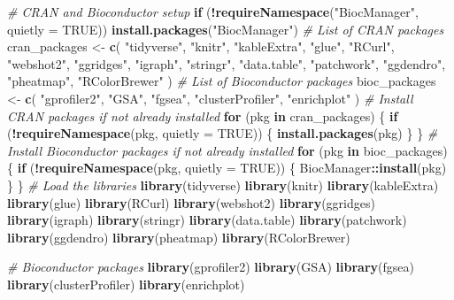 \documentclass[
]{book}
\newenvironment{Shaded}{\begin{snugshade}}{\end{snugshade}}
\newcommand{\AttributeTok}[1]{\textcolor[rgb]{0.13,0.29,0.53}{#1}}
\newcommand{\CommentTok}[1]{\textcolor[rgb]{0.56,0.35,0.01}{\textit{#1}}}
\newcommand{\ConstantTok}[1]{\textcolor[rgb]{0.56,0.35,0.01}{#1}}
\newcommand{\ControlFlowTok}[1]{\textcolor[rgb]{0.13,0.29,0.53}{\textbf{#1}}}
\newcommand{\FunctionTok}[1]{\textcolor[rgb]{0.13,0.29,0.53}{\textbf{#1}}}
\newcommand{\NormalTok}[1]{#1}
\newcommand{\OtherTok}[1]{\textcolor[rgb]{0.56,0.35,0.01}{#1}}
\newcommand{\SpecialCharTok}[1]{\textcolor[rgb]{0.81,0.36,0.00}{\textbf{#1}}}
\newcommand{\StringTok}[1]{\textcolor[rgb]{0.31,0.60,0.02}{#1}}
\begin{document}
\begin{Shaded}
\begin{Highlighting}[]
\CommentTok{\# CRAN and Bioconductor setup}
\ControlFlowTok{if}\NormalTok{ (}\SpecialCharTok{!}\FunctionTok{requireNamespace}\NormalTok{(}\StringTok{"BiocManager"}\NormalTok{, }\AttributeTok{quietly =} \ConstantTok{TRUE}\NormalTok{))}
  \FunctionTok{install.packages}\NormalTok{(}\StringTok{"BiocManager"}\NormalTok{)}
\CommentTok{\# List of CRAN packages}
\NormalTok{cran\_packages }\OtherTok{\textless{}{-}} \FunctionTok{c}\NormalTok{(}
  \StringTok{"tidyverse"}\NormalTok{,}
  \StringTok{"knitr"}\NormalTok{,}
  \StringTok{"kableExtra"}\NormalTok{,}
  \StringTok{"glue"}\NormalTok{,}
  \StringTok{"RCurl"}\NormalTok{,}
  \StringTok{"webshot2"}\NormalTok{,}
  \StringTok{"ggridges"}\NormalTok{,}
  \StringTok{"igraph"}\NormalTok{,}
  \StringTok{"stringr"}\NormalTok{,}
  \StringTok{"data.table"}\NormalTok{,}
  \StringTok{"patchwork"}\NormalTok{,}
  \StringTok{"ggdendro"}\NormalTok{,}
  \StringTok{"pheatmap"}\NormalTok{,}
  \StringTok{"RColorBrewer"}
\NormalTok{)}
\CommentTok{\# List of Bioconductor packages}
\NormalTok{bioc\_packages }\OtherTok{\textless{}{-}} \FunctionTok{c}\NormalTok{(}
  \StringTok{"gprofiler2"}\NormalTok{,}
  \StringTok{"GSA"}\NormalTok{,}
  \StringTok{"fgsea"}\NormalTok{,}
  \StringTok{"clusterProfiler"}\NormalTok{,}
  \StringTok{"enrichplot"}
\NormalTok{)}
\CommentTok{\# Install CRAN packages if not already installed}
\ControlFlowTok{for}\NormalTok{ (pkg }\ControlFlowTok{in}\NormalTok{ cran\_packages) \{}
  \ControlFlowTok{if}\NormalTok{ (}\SpecialCharTok{!}\FunctionTok{requireNamespace}\NormalTok{(pkg, }\AttributeTok{quietly =} \ConstantTok{TRUE}\NormalTok{)) \{}
    \FunctionTok{install.packages}\NormalTok{(pkg)}
\NormalTok{  \}}
\NormalTok{\}}
\CommentTok{\# Install Bioconductor packages if not already installed}
\ControlFlowTok{for}\NormalTok{ (pkg }\ControlFlowTok{in}\NormalTok{ bioc\_packages) \{}
  \ControlFlowTok{if}\NormalTok{ (}\SpecialCharTok{!}\FunctionTok{requireNamespace}\NormalTok{(pkg, }\AttributeTok{quietly =} \ConstantTok{TRUE}\NormalTok{)) \{}
\NormalTok{    BiocManager}\SpecialCharTok{::}\FunctionTok{install}\NormalTok{(pkg)}
\NormalTok{  \}}
\NormalTok{\}}
\CommentTok{\# Load the libraries}
\FunctionTok{library}\NormalTok{(tidyverse)}
\FunctionTok{library}\NormalTok{(knitr)}
\FunctionTok{library}\NormalTok{(kableExtra)}
\FunctionTok{library}\NormalTok{(glue)}
\FunctionTok{library}\NormalTok{(RCurl)}
\FunctionTok{library}\NormalTok{(webshot2)}
\FunctionTok{library}\NormalTok{(ggridges)}
\FunctionTok{library}\NormalTok{(igraph)}
\FunctionTok{library}\NormalTok{(stringr)}
\FunctionTok{library}\NormalTok{(data.table)}
\FunctionTok{library}\NormalTok{(patchwork)}
\FunctionTok{library}\NormalTok{(ggdendro)}
\FunctionTok{library}\NormalTok{(pheatmap)}
\FunctionTok{library}\NormalTok{(RColorBrewer)}

\CommentTok{\# Bioconductor packages}
\FunctionTok{library}\NormalTok{(gprofiler2)}
\FunctionTok{library}\NormalTok{(GSA)}
\FunctionTok{library}\NormalTok{(fgsea)}
\FunctionTok{library}\NormalTok{(clusterProfiler)}
\FunctionTok{library}\NormalTok{(enrichplot)}
\end{Highlighting}
\end{Shaded}
\end{document}
